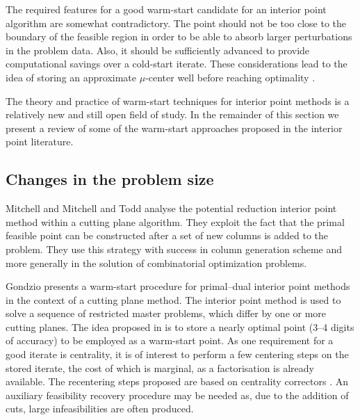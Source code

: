 The required features for a good warm-start candidate for an
interior point algorithm are somewhat contradictory.
The point should not be too close to the boundary of the feasible 
region in order to be able to absorb larger perturbations in the 
problem data. 
Also, it should be sufficiently advanced to provide 
computational savings over a cold-start iterate.
These considerations lead to the idea of storing an approximate
$\mu$-center well before reaching optimality 
\cite{Gondzio98,GondzioGrothey03,GondzioVial,YildirimWright}.

The theory and practice of warm-start techniques for interior point 
methods is a relatively new and still open field of study.
In the remainder of this section we present a review of some 
of the warm-start approaches proposed in the interior point literature.

%
%
\subsection{Changes in the problem size}

Mitchell \cite{phd:Mitchell} and Mitchell and Todd \cite{MitchellTodd}
analyse the potential reduction interior point method within
a cutting plane algorithm. They exploit the fact that
the primal feasible point can be constructed after a set of new
columns is added to the problem. They use this strategy with success
in column generation scheme and more generally in the solution 
of combinatorial optimization problems.

Gondzio \cite{Gondzio98} presents a warm-start procedure for 
primal--dual interior point methods in the context of a cutting 
plane method. The interior 
point method is used to solve a sequence of restricted master 
problems, which differ by one or more cutting planes.
%
%
The idea proposed in \cite{Gondzio98} is to store a nearly optimal 
point (3--4 digits of accuracy) to be employed as a warm-start point.
%
%
As one requirement for a good iterate is centrality, it is of interest 
to perform a few centering steps on the stored iterate, the cost of 
which is marginal, as a factorisation is already available. The 
recentering steps proposed are based on
centrality correctors \cite{Gondzio96}.
An auxiliary feasibility recovery procedure may be needed as, due to 
the addition of cuts, large infeasibilities are often produced.

